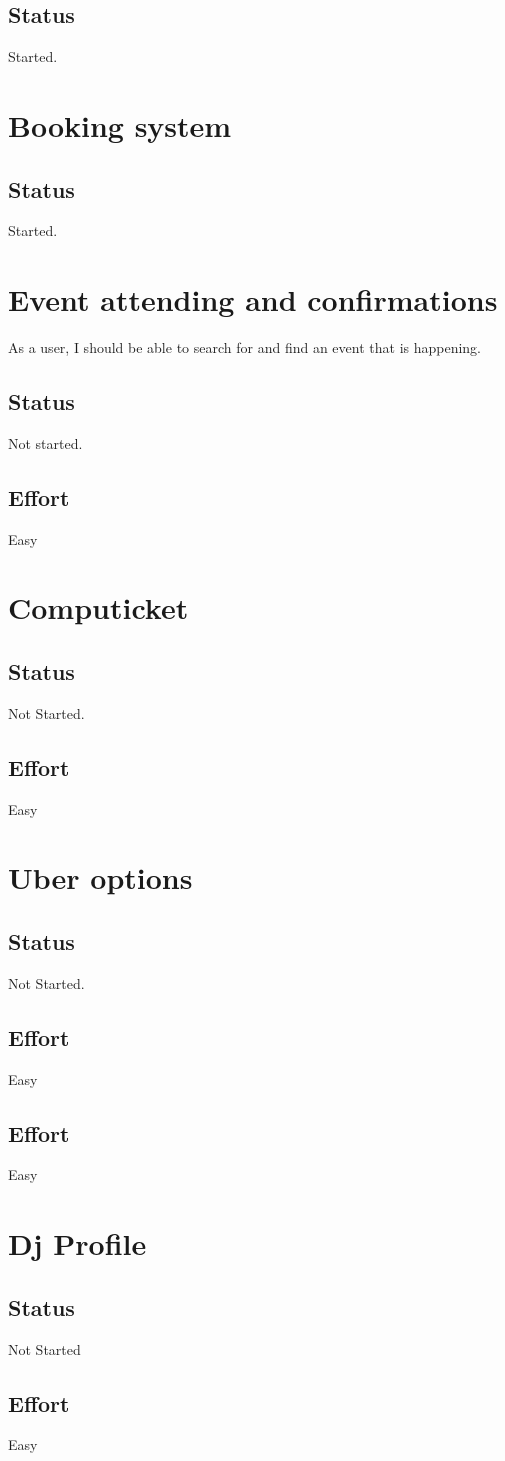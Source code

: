 \documentclass[10pt,a4paper]{article}
\begin{document}
\subsection{Status}
Started.

\section{Booking system}

\subsection{Status}
Started.


\section{Event attending and confirmations}
As a user, I should be able to search for and find an event that is happening.
\subsection{Status}
Not started.

\subsection{Effort}
Easy

\section{Computicket}

\subsection{Status}
Not Started.

\subsection{Effort}
Easy

\section{Uber options}

\subsection{Status}
Not Started.

\subsection{Effort}
Easy


\subsection{Effort}
Easy

\section{Dj Profile}

\subsection{Status}
Not Started

\subsection{Effort}
Easy
\end{document}
